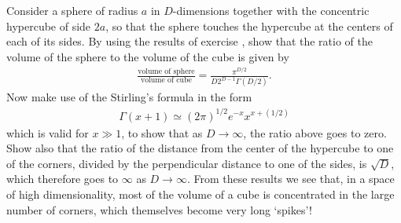 \begin{question}{1.19}
	Consider a sphere of radius $a$ in $D$-dimensions together with the concentric hypercube of side $2a$, so that the sphere touches the hypercube at the centers of each of its sides. By using the results of exercise , show that the ratio of the volume of the sphere to the volume of the cube is given by
	\begin{align*}
		\frac{\mbox{volume of sphere}}{\mbox{volume of cube}} = \frac{\pi^{D/2}}{D2^{D-1}\Gamma(D/2)}.
	\end{align*}
	Now make use of the Stirling's formula in the form
	\begin{align*}
		\Gamma(x + 1)  \simeq (2\pi)^{1/2} e^{-x} x^{x + (1/2)}
	\end{align*}
	which is valid for $x \gg 1$, to show that as $D \rightarrow \infty$, the ratio above goes to zero. Show also that the ratio of the distance from the center of the hypercube to one of the corners, divided by the perpendicular distance to one of the sides, is $\sqrt{D}$, which therefore goes to $\infty$ as $D \rightarrow \infty$. From these results we see that, in a space of high dimensionality, most of the volume of a cube is concentrated in the large number of corners, which themselves become very long `spikes'!
\end{question}

